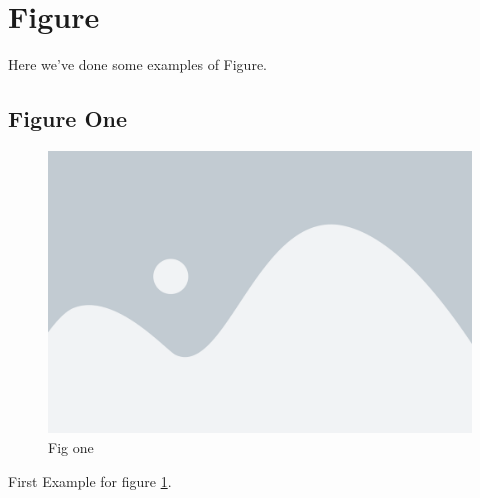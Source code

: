 \section{Figure}
Here we've done some examples of Figure.

\subsection{Figure One}

\begin{figure}[!h]
  \includegraphics[width=\linewidth]{../images/fig1.png}
  \caption{Fig one}
  \label{fig:figone}
\end{figure}
First Example for figure  \ref{fig:figone}.
\lipsum[1-1]
